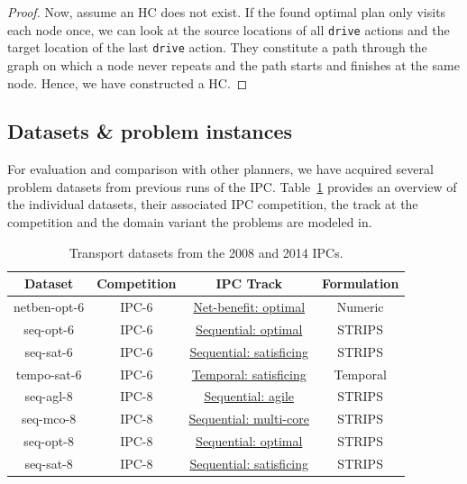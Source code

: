 \begin{proof}
Now, assume an HC does not exist. If the found optimal plan only visits each node once,
we can look at the source locations of all \verb+drive+ actions and the target
location of the last \verb+drive+ action. They constitute a path through the graph on which a node never repeats and the path starts and finishes at the same node.
Hence, we have constructed a HC.
\end{proof}


\subsection{Datasets \& problem instances}

For evaluation and comparison with other planners, we have acquired several problem datasets from previous runs of the IPC.
Table~\ref{tab:ipc-datasets} provides an overview of the individual datasets, their associated IPC competition, the track at the competition and the domain variant the problems are modeled in.

\begin{table}[tb]
\begin{tabular}{c||ccc}
\textbf{Dataset} & \textbf{Competition} & \textbf{IPC Track} & \textbf{Formulation} \\ 
\midrule
\midrule
netben-opt-6 & IPC-6 & \href{http://icaps-conference.org/ipc2008/deterministic/NetBenefitOptimization.html}{Net-benefit: optimal} & Numeric \\ 
seq-opt-6 & IPC-6 & \href{http://icaps-conference.org/ipc2008/deterministic/SequentialOptimization.html}{Sequential: optimal} & STRIPS \\ 
seq-sat-6 & IPC-6 & \href{http://icaps-conference.org/ipc2008/deterministic/SequentialSatisficing.html}{Sequential: satisficing} & STRIPS \\ 
tempo-sat-6 & IPC-6 & \href{http://icaps-conference.org/ipc2008/deterministic/TemporalSatisficing.html}{Temporal: satisficing} & Temporal \\ 
\midrule
seq-agl-8 & IPC-8 & \href{https://helios.hud.ac.uk/scommv/IPC-14/seqagi.html}{Sequential: agile} & STRIPS \\ 
seq-mco-8 & IPC-8 & \href{https://helios.hud.ac.uk/scommv/IPC-14/seqmulti.html}{Sequential: multi-core} & STRIPS \\ 
seq-opt-8 & IPC-8 & \href{https://helios.hud.ac.uk/scommv/IPC-14/seqopt.html}{Sequential: optimal} & STRIPS \\ 
seq-sat-8 & IPC-8 & \href{https://helios.hud.ac.uk/scommv/IPC-14/seqsat.html}{Sequential: satisficing} & STRIPS \\ 
\end{tabular}
\caption{Transport datasets from the 2008 and 2014 IPCs.}
\label{tab:ipc-datasets}
\end{table}

